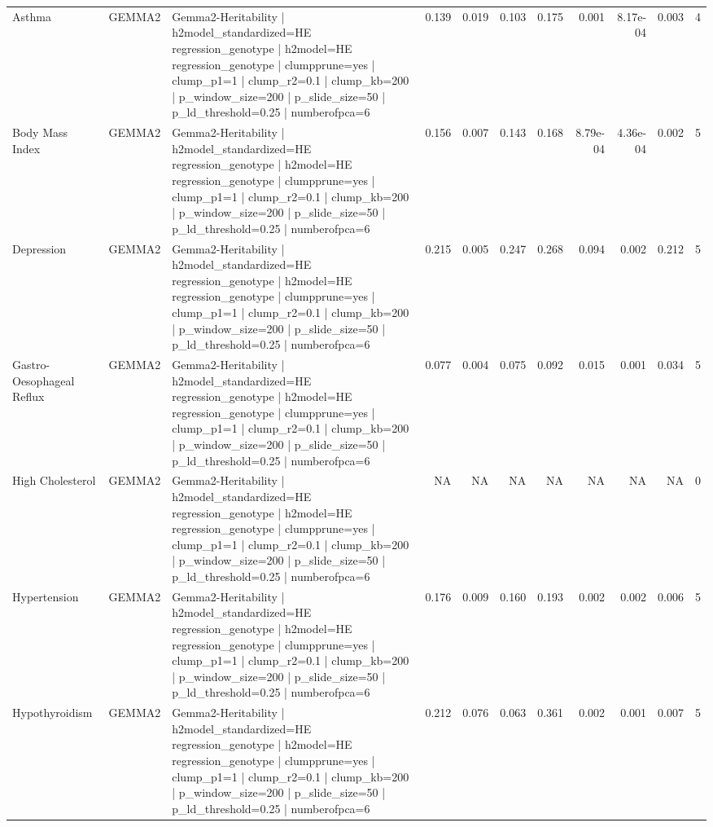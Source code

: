 \begin{landscape}
\begin{longtable}{p{2.4cm}p{1.8cm}p{6.0cm}rrrrrrrr}
Asthma & GEMMA2 & Gemma2-Heritability | h2model\_standardized=HE regression\_genotype | h2model=HE regression\_genotype | clumpprune=yes | clump\_p1=1 | clump\_r2=0.1 | clump\_kb=200 | p\_window\_size=200 | p\_slide\_size=50 | p\_ld\_threshold=0.25 | numberofpca=6 & 0.139 & 0.019 & 0.103 & 0.175 & 0.001 & 8.17e-04 & 0.003 & 4 \\
Body Mass Index & GEMMA2 & Gemma2-Heritability | h2model\_standardized=HE regression\_genotype | h2model=HE regression\_genotype | clumpprune=yes | clump\_p1=1 | clump\_r2=0.1 | clump\_kb=200 | p\_window\_size=200 | p\_slide\_size=50 | p\_ld\_threshold=0.25 | numberofpca=6 & 0.156 & 0.007 & 0.143 & 0.168 & 8.79e-04 & 4.36e-04 & 0.002 & 5 \\
Depression & GEMMA2 & Gemma2-Heritability | h2model\_standardized=HE regression\_genotype | h2model=HE regression\_genotype | clumpprune=yes | clump\_p1=1 | clump\_r2=0.1 | clump\_kb=200 | p\_window\_size=200 | p\_slide\_size=50 | p\_ld\_threshold=0.25 | numberofpca=6 & 0.215 & 0.005 & 0.247 & 0.268 & 0.094 & 0.002 & 0.212 & 5 \\
Gastro-Oesophageal Reflux & GEMMA2 & Gemma2-Heritability | h2model\_standardized=HE regression\_genotype | h2model=HE regression\_genotype | clumpprune=yes | clump\_p1=1 | clump\_r2=0.1 | clump\_kb=200 | p\_window\_size=200 | p\_slide\_size=50 | p\_ld\_threshold=0.25 | numberofpca=6 & 0.077 & 0.004 & 0.075 & 0.092 & 0.015 & 0.001 & 0.034 & 5 \\
High Cholesterol & GEMMA2 & Gemma2-Heritability | h2model\_standardized=HE regression\_genotype | h2model=HE regression\_genotype | clumpprune=yes | clump\_p1=1 | clump\_r2=0.1 | clump\_kb=200 | p\_window\_size=200 | p\_slide\_size=50 | p\_ld\_threshold=0.25 | numberofpca=6 & NA & NA & NA & NA & NA & NA & NA & 0 \\
Hypertension & GEMMA2 & Gemma2-Heritability | h2model\_standardized=HE regression\_genotype | h2model=HE regression\_genotype | clumpprune=yes | clump\_p1=1 | clump\_r2=0.1 | clump\_kb=200 | p\_window\_size=200 | p\_slide\_size=50 | p\_ld\_threshold=0.25 | numberofpca=6 & 0.176 & 0.009 & 0.160 & 0.193 & 0.002 & 0.002 & 0.006 & 5 \\
Hypothyroidism & GEMMA2 & Gemma2-Heritability | h2model\_standardized=HE regression\_genotype | h2model=HE regression\_genotype | clumpprune=yes | clump\_p1=1 | clump\_r2=0.1 | clump\_kb=200 | p\_window\_size=200 | p\_slide\_size=50 | p\_ld\_threshold=0.25 | numberofpca=6 & 0.212 & 0.076 & 0.063 & 0.361 & 0.002 & 0.001 & 0.007 & 5 \\

\end{longtable}
\end{landscape}
